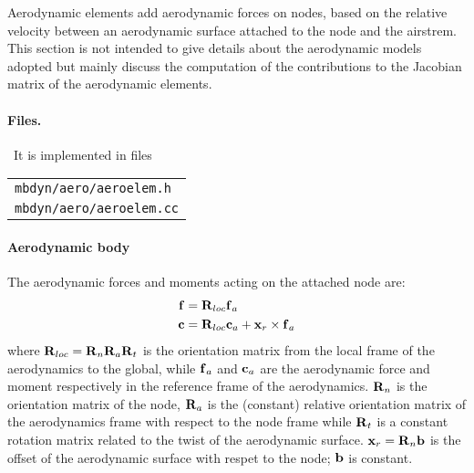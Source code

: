 %
%
%
%
%
% 
%
%
%

Aerodynamic elements add aerodynamic forces on nodes, based on 
the relative velocity between an aerodynamic surface attached 
to the node and the airstrem. This section is not intended 
to give details about the aerodynamic models adopted but mainly 
discuss the computation of the contributions to the Jacobian 
matrix of the aerodynamic elements.

\paragraph{Files.} \
It is implemented in files\\
\begin{tabular}{l}
\texttt{mbdyn/aero/aeroelem.h} \\
\texttt{mbdyn/aero/aeroelem.cc} 
\end{tabular}

\paragraph{Aerodynamic body}

The aerodynamic forces and moments acting on the attached node are:
\begin{subequations}
\begin{align}
	\bm{\mathbf{f}} &= \bm{\mathbf{R}}_{loc} \bm{\mathbf{f}}_a\\ 
	\bm{\mathbf{c}} &= \bm{\mathbf{R}}_{loc} \bm{\mathbf{c}}_a + \bm{\mathbf{x}}_r\times\bm{\mathbf{f}}_a 
\end{align}
\end{subequations}
where $\bm{\mathbf{R}}_{loc} = \bm{\mathbf{R}}_n\bm{\mathbf{R}}_a\bm{\mathbf{R}}_t$ is the orientation 
matrix from the local frame of the aerodynamics to the global, 
while $\bm{\mathbf{f}}_a$ and $\bm{\mathbf{c}}_a$ are the aerodynamic force and moment 
respectively in the reference frame of the aerodynamics. $\bm{\mathbf{R}}_n$
is the orientation matrix of the node, $\bm{\mathbf{R}}_a$ is the (constant) 
relative orientation matrix of the aerodynamics frame with respect 
to the node frame while $\bm{\mathbf{R}}_t$ is a constant rotation matrix 
related to the twist of the aerodynamic surface. $\bm{\mathbf{x}}_r = \bm{\mathbf{R}}_n\bm{\mathbf{b}}$ 
is the offset of the aerodynamic surface with respet to the node; 
$\bm{\mathbf{b}}$ is constant.

